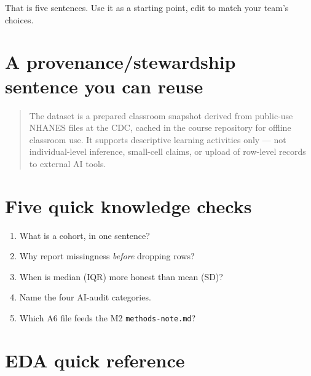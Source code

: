 \documentclass[
  letterpaper,
  DIV=11,
  numbers=noendperiod,
  oneside]{scrreprt}
\providecommand{\tightlist}{%
  \setlength{\itemsep}{0pt}\setlength{\parskip}{0pt}}
\begin{document}
That is five sentences. Use it as a starting point, edit to match your
team's choices.

\section*{A provenance/stewardship sentence you can
reuse}\label{a-provenancestewardship-sentence-you-can-reuse}


\begin{quote}
The dataset is a prepared classroom snapshot derived from public-use
NHANES files at the CDC, cached in the course repository for offline
classroom use. It supports descriptive learning activities only --- not
individual-level inference, small-cell claims, or upload of row-level
records to external AI tools.
\end{quote}

\section*{Five quick knowledge
checks}\label{five-quick-knowledge-checks-1}


\begin{enumerate}
\def\labelenumi{\arabic{enumi}.}
\tightlist
\item
  What is a cohort, in one sentence?
\item
  Why report missingness \emph{before} dropping rows?
\item
  When is median (IQR) more honest than mean (SD)?
\item
  Name the four AI-audit categories.
\item
  Which A6 file feeds the M2 \texttt{methods-note.md}?
\end{enumerate}

\section*{EDA quick reference}\label{eda-quick-reference}

\end{document}

